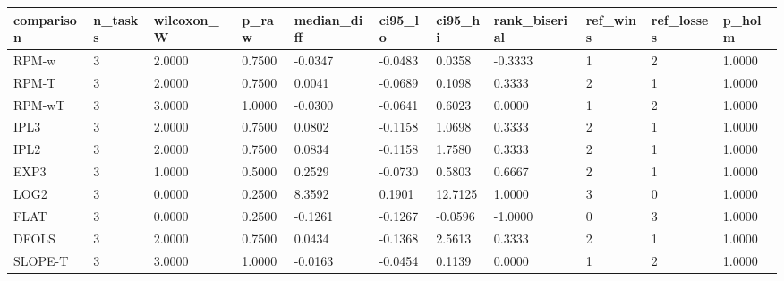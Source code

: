 \begin{tabular}{lllllllllll}
\hline
comparison & n\_tasks & wilcoxon\_W & p\_raw & median\_diff & ci95\_lo & ci95\_hi & rank\_biserial & ref\_wins & ref\_losses & p\_holm \\
\hline
RPM-w & 3 & 2.0000 & 0.7500 & -0.0347 & -0.0483 & 0.0358 & -0.3333 & 1 & 2 & 1.0000 \\
RPM-T & 3 & 2.0000 & 0.7500 & 0.0041 & -0.0689 & 0.1098 & 0.3333 & 2 & 1 & 1.0000 \\
RPM-wT & 3 & 3.0000 & 1.0000 & -0.0300 & -0.0641 & 0.6023 & 0.0000 & 1 & 2 & 1.0000 \\
IPL3 & 3 & 2.0000 & 0.7500 & 0.0802 & -0.1158 & 1.0698 & 0.3333 & 2 & 1 & 1.0000 \\
IPL2 & 3 & 2.0000 & 0.7500 & 0.0834 & -0.1158 & 1.7580 & 0.3333 & 2 & 1 & 1.0000 \\
EXP3 & 3 & 1.0000 & 0.5000 & 0.2529 & -0.0730 & 0.5803 & 0.6667 & 2 & 1 & 1.0000 \\
LOG2 & 3 & 0.0000 & 0.2500 & 8.3592 & 0.1901 & 12.7125 & 1.0000 & 3 & 0 & 1.0000 \\
FLAT & 3 & 0.0000 & 0.2500 & -0.1261 & -0.1267 & -0.0596 & -1.0000 & 0 & 3 & 1.0000 \\
DFOLS & 3 & 2.0000 & 0.7500 & 0.0434 & -0.1368 & 2.5613 & 0.3333 & 2 & 1 & 1.0000 \\
SLOPE-T & 3 & 3.0000 & 1.0000 & -0.0163 & -0.0454 & 0.1139 & 0.0000 & 1 & 2 & 1.0000 \\
\hline
\end{tabular}
